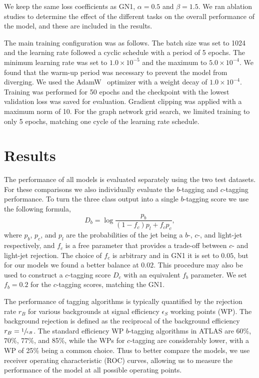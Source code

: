 We keep the same loss coefficients as GN1, $\alpha = 0.5$ and $\beta = 1.5$.
We ran ablation studies to determine the effect of the different tasks on the overall performance of the model, and these are included in the results.

The main training configuration was as follows.
The batch size was set to 1024 and the learning rate followed a cyclic schedule with a period of 5 epochs.
The minimum learning rate was set to $1.0 \times 10^{-5}$ and the maximum to $5.0 \times 10^{-4}$.
We found that the warm-up period was necessary to prevent the model from diverging.
We used the AdamW~\cite{AdamW} optimizer with a weight decay of $1.0 \times 10^{-4}$.
Training was performed for 50 epochs and the checkpoint with the lowest validation loss was saved for evaluation.
Gradient clipping was applied with a maximum norm of 10.
For the graph network grid search, we limited training to only 5 epochs, matching one cycle of the learning rate schedule.

\section{Results}

The performance of all models is evaluated separately using the two test datasets.
For these comparisons we also individually evaluate the $b$-tagging and $c$-tagging performance.
To turn the three class output into a single $b$-tagging score we use the following formula,
\begin{equation}
    D_b = \log\frac{p_b}{(1-f_c)p_l + f_c p_c},
\end{equation}
where $p_b$, $p_c$, and $p_l$ are the probabilities of the jet being a $b$-, $c$-, and light-jet respectively, and $f_c$ is a free parameter that provides a trade-off between $c$- and light-jet rejection.
The choice of $f_c$ is arbitrary and in GN1 it is set to $0.05$, but for our models we found a better balance at $0.02$.
This procedure may also be used to construct a $c$-tagging score $D_c$ with an equivalent $f_b$ parameter.
We set $f_b = 0.2$ for the $c$-tagging scores, matching the GN1.

The performance of tagging algorithms is typically quantified by the rejection rate $r_B$ for various backgrounds at signal efficiency $\epsilon_S$ working points (WP).
The background rejection is defined as the reciprocal of the background efficiency $r_B = \sfrac{1}{\epsilon_B}$.
The standard efficiency WP $b$-tagging algorithms in ATLAS are 60\%, 70\%, 77\%, and 85\%, while the WPs for $c$-tagging are considerably lower, with a WP of 25\% being a common choice.
Thus to better compare the models, we use receiver operating characteristic (ROC) curves, allowing us to measure the performance of the model at all possible operating points.

